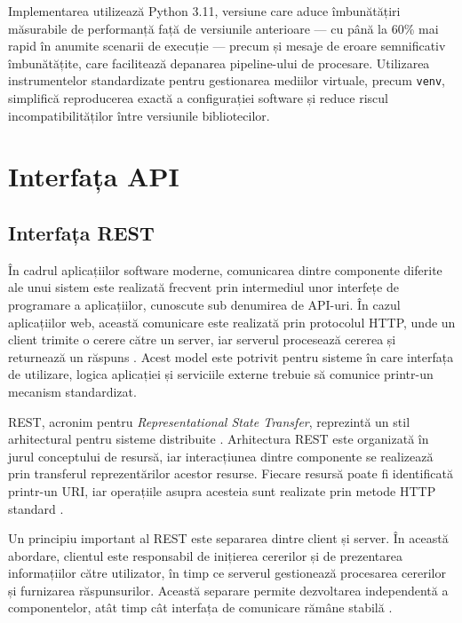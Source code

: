 \documentclass[12pt, a4paper, oneside, romanian]{teza-upb}
\begin{document}
Implementarea utilizează Python 3.11, versiune care aduce îmbunătățiri măsurabile
de performanță față de versiunile anterioare — cu până la 60\% mai rapid în anumite
scenarii de execuție \cite{python311} — precum și
mesaje de eroare semnificativ îmbunătățite, care facilitează depanarea pipeline-ului
de procesare. Utilizarea instrumentelor standardizate pentru gestionarea mediilor
virtuale, precum \texttt{venv}, simplifică reproducerea exactă
a configurației software și reduce riscul incompatibilităților între versiunile
bibliotecilor.



\section{Interfața API}


\subsection{Interfața REST}

În cadrul aplicațiilor software moderne, comunicarea dintre componente diferite ale unui sistem este realizată frecvent prin intermediul unor interfețe de programare a aplicațiilor, cunoscute sub denumirea de API-uri. În cazul aplicațiilor web, această comunicare este realizată prin protocolul HTTP, unde un client trimite o cerere către un server, iar serverul procesează cererea și returnează un răspuns \cite{mdn_client_server}. Acest model este potrivit pentru sisteme în care interfața de utilizare, logica aplicației și serviciile externe trebuie să comunice printr-un mecanism standardizat.

REST, acronim pentru \textit{Representational State Transfer}, reprezintă un stil arhitectural pentru sisteme distribuite \cite{fielding_rest}. Arhitectura REST este organizată în jurul conceptului de resursă, iar interacțiunea dintre componente se realizează prin transferul reprezentărilor acestor resurse. Fiecare resursă poate fi identificată printr-un URI, iar operațiile asupra acesteia sunt realizate prin metode HTTP standard \cite{fielding_rest,mdn_rest}.

Un principiu important al REST este separarea dintre client și server. În această abordare, clientul este responsabil de inițierea cererilor și de prezentarea informațiilor către utilizator, în timp ce serverul gestionează procesarea cererilor și furnizarea răspunsurilor. Această separare permite dezvoltarea independentă a componentelor, atât timp cât interfața de comunicare rămâne stabilă \cite{fielding_rest}.
\end{document}
